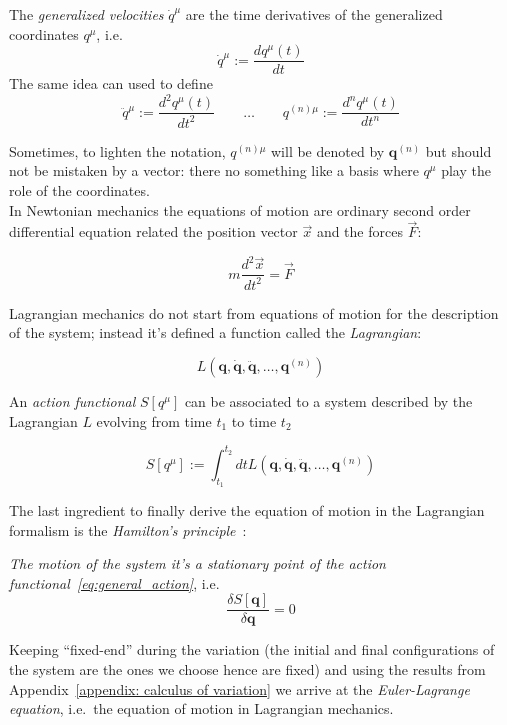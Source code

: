 \begin{definition}
  The \emph{generalized velocities} $\dot{q}^{\mu}$ are the time derivatives of
  the generalized coordinates $q^{\mu}$, i.e.
  \begin{equation*}
    \dot{q}^{\mu} := \frac{dq^{\mu}(t)}{dt}
  \end{equation*}
  The same idea can used to define
  \begin{equation*}
    \ddot{q}^{\mu} := \frac{d^2 q^{\mu}(t)}{dt^2} \qquad \ldots \qquad
        q^{(n)\mu} := \frac{d^n q^{\mu}(t)}{dt^n}
  \end{equation*}
\end{definition}

Sometimes, to lighten the notation, $q^{(n)\mu}$ will be denoted by
$\bm{q}^{(n)}$ but should not be mistaken by a vector: there no something
like a basis where $q^{\mu}$ play the role of the coordinates. \\

In Newtonian mechanics the equations of motion are ordinary second order
differential equation related the position vector $\vec{x}$ and the forces
$\vec{F}$:

\begin{equation*}
  m \frac{d^2\vec{x}}{dt^2} = \vec{F}
\end{equation*}

Lagrangian mechanics do not start from equations of motion for the description
of the system; instead it's defined a function called the \emph{Lagrangian}:

\begin{equation} \label{eq:general_lagrangian}
  L(\bm{q}, \dot{\bm{q}}, \ddot{\bm{q}}, \ldots, \bm{q}^{(n)})
\end{equation}

An \emph{action functional} $S[q^{\mu}]$ can be associated to a system described
by the Lagrangian $L$ evolving from time $t_1$ to time $t_2$

\begin{equation} \label{eq:general_action}
  S[q^{\mu}] := \int_{t_1}^{t_2} dt
  L(\bm{q}, \dot{\bm{q}}, \ddot{\bm{q}}, \ldots, \bm{q}^{(n)})
\end{equation}

The last ingredient to finally derive the equation of motion in the Lagrangian
formalism is the \emph{Hamilton's principle}~\cite{Goldstein11_Ham_principle}:
\begin{displayquote}
  \emph{The motion of the system it's a stationary point of the action
  functional~\eqref{eq:general_action}}, i.e.
  \begin{equation*}
    \frac{\delta S[\bm{q}]}{\delta \bm{q}} = 0
  \end{equation*}
\end{displayquote}
Keeping ``fixed-end'' during the variation (the initial and final configurations
of the system are the ones we choose hence are fixed) and using the results from
Appendix~\ref{appendix: calculus of variation} we arrive at the
\emph{Euler-Lagrange equation}, i.e.\ the equation of motion in Lagrangian
mechanics.

